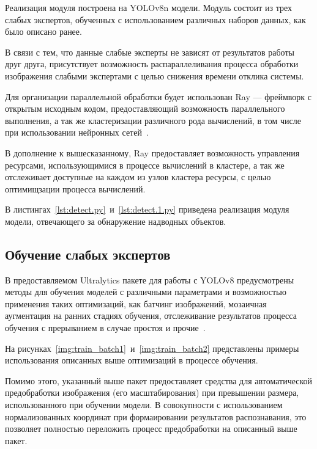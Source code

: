 Реализация модуля построена на YOLOv8n модели. Модуль состоит из трех слабых экспертов, обученных с использованием различных наборов данных, как было описано ранее.

В связи с тем, что данные слабые эксперты не зависят от результатов работы друг друга, присутствует возможность распараллеливания процесса обработки изображения слабыми экспертами с целью снижения времени отклика системы.

Для организации параллельной обработки будет использован Ray --- фреймворк с открытым исходным кодом, предоставляющий возможность параллельного выполнения, а так же кластеризации различного рода вычислений, в том числе при использовании нейронных сетей~\cite{pkg-ray}. 

В дополнение к вышесказанному, Ray предоставляет возможность управления ресурсами, использующимися в процессе вычислений в кластере, а так же отслеживает доступные на каждом из узлов кластера ресурсы, с целью оптимищзации процесса вычислений.

В листингах~\ref{lst:detect.py}~и~\ref{lst:detect.1.py} приведена реализация модуля модели, отвечающего за обнаружение надводных объектов.


\subsection{Обучение слабых экспертов}

В предоставляемом Ultralytics пакете для работы с YOLOv8 предусмотрены методы для обучения моделей с различными параметрами и возможностью применения таких оптимизаций, как батчинг изображений, мозаичная аугментация на ранних стадиях обучения, отслеживание результатов процесса обучения с прерыванием в случае простоя и прочие~\cite{pkg-ultralytics}.

На рисунках~\ref{img:train_batch1}~и~\ref{img:train_batch2} представлены примеры использования описанных выше оптимизаций в процессе обучения.



Помимо этого, указанный выше пакет предоставляет средства для автоматической предобработки изображения (его масштабирования) при превышении размера, использованного при обучении модели. В совокупности с использованием нормализованных координат при формаировании результатов распознавания, это позволяет полностью переложить процесс предобработки на описанный выше пакет.

